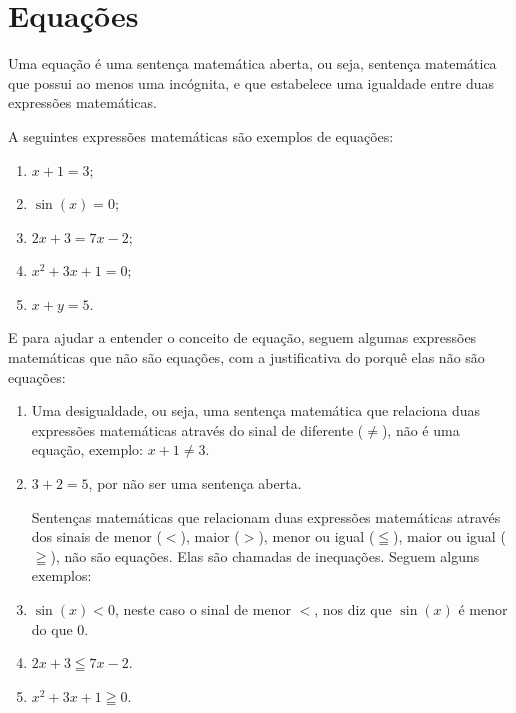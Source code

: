 
\chapter{Equações}

\colorbox{azul}{
 \begin{minipage}{0.9\linewidth}
 \begin{center}
   Uma equação é uma sentença matemática aberta, ou seja, sentença matemática que possui ao menos uma incógnita, e que estabelece uma igualdade entre duas expressões matemáticas.
 \end{center}
 \end{minipage}}

 \vskip0.3cm

 \begin{exem}
 A seguintes expressões matemáticas são exemplos de equações:

\begin{enumerate}[(1)]
 \item $x+1=3$;
 \item $\sin(x)=0$;
 \item $2x+3=7x-2$;
 \item $x^2+3x+1=0$;
 \item $x+y= 5$.
\end{enumerate}
\end{exem}

 E para ajudar a entender o conceito de equação, seguem algumas expressões matemáticas que não são equações, com a justificativa do porquê elas não são equações:
\begin{exem}
\begin{enumerate}[(1)]
 \item Uma desigualdade, ou seja, uma sentença matemática que relaciona duas expressões matemáticas através do sinal de diferente ($\neq$), não é uma equação, exemplo: $x+1 \neq 3$.

 \item $3 + 2 = 5$, por não ser uma sentença aberta.

 Sentenças matemáticas que relacionam duas expressões matemáticas através dos sinais de menor ($<$), maior ($>$), menor ou igual ($\leqq$), maior ou igual ($\geqq$), não são equações. Elas são chamadas de inequações. Seguem alguns exemplos:

 \item $\sin(x) < 0$, neste caso o sinal de menor $<$, nos diz que $\sin(x)$ é menor do que $0$.
 \item $2x+3 \leqq 7x-2$.
 \item $x^2+3x+1 \geqq 0$.
\end{enumerate}
\end{exem}



